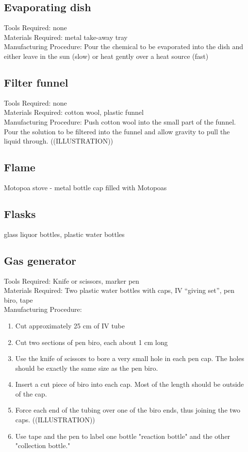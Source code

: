 \subsection{Evaporating dish}
Tools Required: none\\
Materials Required: metal take-away tray\\
Manufacturing Procedure: Pour the chemical to be evaporated into the dish and either leave in the sun (slow) or heat gently over a heat source (fast)

\subsection{Filter funnel}
Tools Required: none\\
Materials Required: cotton wool, plastic funnel\\
Manufacturing Procedure: Push cotton wool into the small part of the funnel. Pour the solution to be filtered into the funnel and allow gravity to pull the liquid through. ((ILLUSTRATION))

\subsection{Flame}
Motopoa stove - metal bottle cap filled with Motopoas

\subsection{Flasks}
glass liquor bottles, plastic water bottles

\subsection{Gas generator}
Tools Required: Knife or scissors, marker pen\\
Materials Required: Two plastic water bottles with caps, IV ``giving set'', pen biro, tape\\
Manufacturing Procedure:
\begin{enumerate}
\item{Cut approximately 25 cm of IV tube}
\item{Cut two sections of pen biro, each about 1 cm long}
\item{Use the knife of scissors to bore a very small hole in each pen cap. The holes should be exactly the same size as the pen biro.}
\item{Insert a cut piece of biro into each cap. Most of the length should be outside of the cap.}
\item{Force each end of the tubing over one of the biro ends, thus joining the two caps. ((ILLUSTRATION))}
\item{Use tape and the pen to label one bottle "reaction bottle" and the other "collection bottle."}
\end{enumerate}

